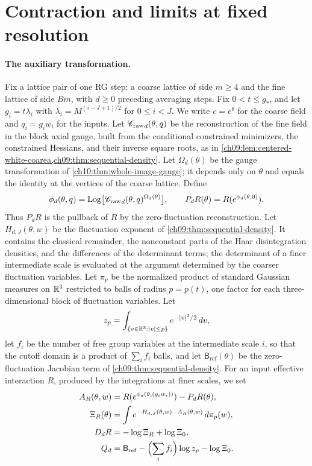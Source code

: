 \section{Contraction and limits at fixed resolution}\label{ch12:sec:operators}

\paragraph{The auxiliary transformation.}
Fix a lattice pair of one RG step: a coarse lattice of side $m\ge4$ and the fine lattice of side $Bm$, with $d\ge0$ preceding averaging steps. Fix $0<t\le g_*$, and let $g_i=t\lambda_i$ with $\lambda_i=M^{(i-J+1)/2}$ for $0\le i<J$. We write $c=e^\theta$ for the coarse field and $q_i=g_iw_i$ for the inputs. Let ${\mathscr C_{\mathrm{raw}}}_d(\theta,q)$ be the reconstruction of the fine field in the block axial gauge, built from the conditional constrained minimizers, the constrained Hessians, and their inverse square roots, as in \cref{ch09:lem:centered-white-coarea,ch09:thm:sequential-density}. Let $\Omega_d(\theta)$ be the gauge transformation of \cref{ch10:thm:whole-image-gauge}; it depends only on $\theta$ and equals the identity at the vertices of the coarse lattice. Define
\[
 \phi_d(\theta,q)=\operatorname{Log}\bigl[{\mathscr C_{\mathrm{raw}}}_d(\theta,q)^{\Omega_d(\theta)}\bigr],\qquad
 P_dR(\theta)=R(e^{\phi_d(\theta,0)}).
\]
Thus $P_dR$ is the pullback of $R$ by the zero-fluctuation reconstruction. Let $H_{d,J}(\theta,w)$ be the fluctuation exponent of \cref{ch09:thm:sequential-density}. It contains the classical remainder, the nonconstant parts of the Haar disintegration densities, and the differences of the determinant terms; the determinant of a finer intermediate scale is evaluated at the argument determined by the coarser fluctuation variables. Let $\pi_p$ be the normalized product of standard Gaussian measures on $\mathbb R^3$ restricted to balls of radius $p=p(t)$, one factor for each three-dimensional block of fluctuation variables. Let
\[
 z_p=\int_{\{v\in\mathbb R^3:\lvert v\rvert\le p\}}e^{-\lvert v\rvert^2/2}\,dv ,
\]
let $f_i$ be the number of free group variables at the intermediate scale $i$, so that the cutoff domain is a product of $\sum_if_i$ balls, and let $\mathsf B_{\mathrm{ref}}(\theta)$ be the zero-fluctuation Jacobian term of \cref{ch09:thm:sequential-density}. For an input effective interaction $R$, produced by the integrations at finer scales, we set
\begin{equation}
 \begin{split}
 A_R(\theta,w)&=R(e^{\phi_d(\theta,(g_iw_i))})-P_dR(\theta),\\
 \Xi_R(\theta)&=\int e^{-H_{d,J}(\theta,w)-A_R(\theta,w)}\,d\pi_p(w),\\
 D_dR&=-\log\Xi_R+\log\Xi_0,\\
 Q_d&=\mathsf B_{\mathrm{ref}}-\Bigl(\sum_if_i\Bigr)\log z_p-\log\Xi_0 .
 \end{split}\label{ch12:eq:operator}
\end{equation}
